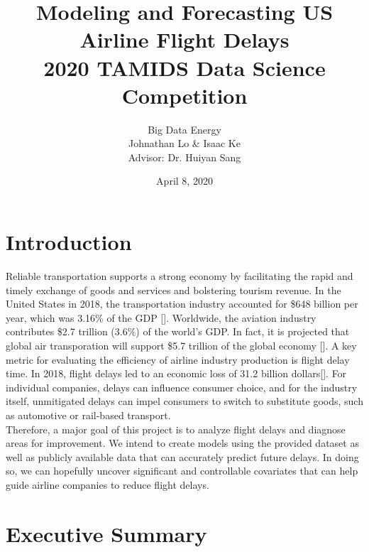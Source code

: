 \documentclass[12pt, a4paper, openany]{book}
\title{Modeling and Forecasting US Airline Flight Delays\\2020 TAMIDS Data Science Competition}
\author{Big Data Energy\\Johnathan Lo \& Isaac Ke\\Advisor: Dr. Huiyan Sang}
\date{April 8, 2020}
\newcommand\tab[1][1cm]{\hspace*{#1}}
\begin{document}
\pagestyle{empty}
\maketitle
  \tableofcontents \thispagestyle{empty}
\pagestyle{empty}
\chapter{Introduction}
\setcounter{page}{1}
\tab Reliable transportation supports a strong economy by facilitating the rapid and timely exchange of goods and services and bolstering tourism revenue. In the United States in 2018, the transportation industry accounted for \$648 billion per year, which was 3.16\% of the GDP [\cite{1}]. Worldwide, the aviation industry contributes \$2.7 trillion (3.6\%) of the world's GDP. In fact, it is projected that global air transporation will support \$5.7 trillion of the global economy [\cite{2}]. A key metric for evaluating the efficiency of airline industry production is flight delay time. In 2018, flight delays led to an economic loss of 31.2 billion dollars[\cite{3}]. For individual companies, delays can influence consumer choice, and for the industry itself, unmitigated delays can impel consumers to switch to substitute goods, such as automotive or rail-based transport. \\
\tab Therefore, a major goal of this project is to analyze flight delays and diagnose areas for improvement. We intend to create models using the provided dataset as well as publicly available data that can accurately predict future delays. In doing so, we can hopefully uncover significant and controllable covariates that can help guide airline companies to reduce flight delays. 
\chapter{Executive Summary}
\end{document}

